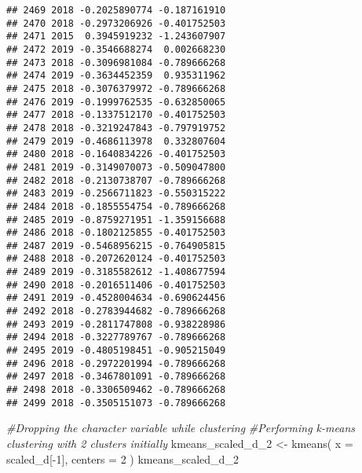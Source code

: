 \documentclass[
]{article}
\newenvironment{Shaded}{\begin{snugshade}}{\end{snugshade}}
\newcommand{\AttributeTok}[1]{\textcolor[rgb]{0.77,0.63,0.00}{#1}}
\newcommand{\CommentTok}[1]{\textcolor[rgb]{0.56,0.35,0.01}{\textit{#1}}}
\newcommand{\DecValTok}[1]{\textcolor[rgb]{0.00,0.00,0.81}{#1}}
\newcommand{\FunctionTok}[1]{\textcolor[rgb]{0.00,0.00,0.00}{#1}}
\newcommand{\NormalTok}[1]{#1}
\newcommand{\OtherTok}[1]{\textcolor[rgb]{0.56,0.35,0.01}{#1}}
\newcommand{\SpecialCharTok}[1]{\textcolor[rgb]{0.00,0.00,0.00}{#1}}
\begin{document}
\begin{verbatim}
## 2469 2018 -0.2025890774 -0.187161910
## 2470 2018 -0.2973206926 -0.401752503
## 2471 2015  0.3945919232 -1.243607907
## 2472 2019 -0.3546688274  0.002668230
## 2473 2018 -0.3096981084 -0.789666268
## 2474 2019 -0.3634452359  0.935311962
## 2475 2018 -0.3076379972 -0.789666268
## 2476 2019 -0.1999762535 -0.632850065
## 2477 2018 -0.1337512170 -0.401752503
## 2478 2018 -0.3219247843 -0.797919752
## 2479 2019 -0.4686113978  0.332807604
## 2480 2018 -0.1640834226 -0.401752503
## 2481 2019 -0.3149070073 -0.509047800
## 2482 2018 -0.2130738707 -0.789666268
## 2483 2019 -0.2566711823 -0.550315222
## 2484 2018 -0.1855554754 -0.789666268
## 2485 2019 -0.8759271951 -1.359156688
## 2486 2018 -0.1802125855 -0.401752503
## 2487 2019 -0.5468956215 -0.764905815
## 2488 2018 -0.2072620124 -0.401752503
## 2489 2019 -0.3185582612 -1.408677594
## 2490 2018 -0.2016511406 -0.401752503
## 2491 2019 -0.4528004634 -0.690624456
## 2492 2018 -0.2783944682 -0.789666268
## 2493 2019 -0.2811747808 -0.938228986
## 2494 2018 -0.3227789767 -0.789666268
## 2495 2019 -0.4805198451 -0.905215049
## 2496 2018 -0.2972201994 -0.789666268
## 2497 2018 -0.3467801091 -0.789666268
## 2498 2018 -0.3306509462 -0.789666268
## 2499 2018 -0.3505151073 -0.789666268
\end{verbatim}

\begin{Shaded}
\begin{Highlighting}[]
\CommentTok{\#Dropping the character variable while clustering}
\CommentTok{\#Performing k{-}means clustering with 2 clusters initially}
\NormalTok{kmeans\_scaled\_d\_2 }\OtherTok{\textless{}{-}} \FunctionTok{kmeans}\NormalTok{(}
  \AttributeTok{x =}\NormalTok{ scaled\_d[}\SpecialCharTok{{-}}\DecValTok{1}\NormalTok{],}
  \AttributeTok{centers =} \DecValTok{2}
\NormalTok{)}
\NormalTok{kmeans\_scaled\_d\_2}
\end{Highlighting}
\end{Shaded}
\end{document}
